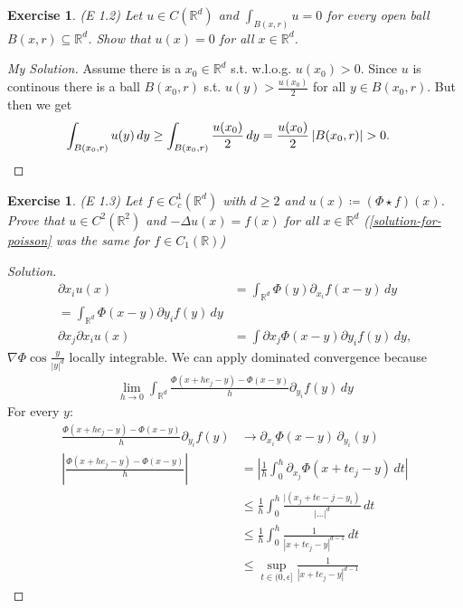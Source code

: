 \documentclass{report}
\theoremstyle{tommy}
\newtheorem{ex}[defn]{Exercise}
\begin{document}
\begin{ex} (E 1.2)
  Let \(u \in C(\mathbb{R}^d)\) and \(\int_{B(x, r)} u = 0\) for every open ball \(B(x, r) \subseteq \mathbb{R}^d\). Show that \(u(x) = 0\) for all \(x \in \mathbb{R}^d\).
\end{ex}

\begin{proof} [My Solution]
  Assume there is a \(x_0 \in \mathbb{R}^d\) s.t. w.l.o.g. \(u(x_0) > 0\). Since \(u\) is continous there is a ball \(B(x_0, r)\) s.t. \(u(y) > \frac{u(x_0)}{2}\) for all \(y \in B(x_0, r)\). But then we get
  \begin{align*}
    \int_{B(x_0, r)} u(y) \, dy
    &\ge \int_{B(x_0, r)} \frac{u(x_0)}{2} \, dy
    = \frac{u(x_0)}{2} \, |B(x_0, r)| > 0. \qedhere
  \end{align*}
\end{proof}

\begin{ex} (E 1.3)
  Let \(f \in C_c^1(\mathbb{R}^d)\) with \(d \ge 2\) and \(u(x) \coloneqq (\Phi \star f)(x)\). Prove that \(u \in C^2(\mathbb{R}^2)\) and \(- \Delta u(x) = f(x)\) for all \(x \in \mathbb{R}^d\) (\ref{solution-for-poisson} was the same for \(f \in C_1(\mathbb{R})\))
\end{ex}

\begin{proof} [Solution]
  \begin{align*}
    \partial x_i u(x) 
    &= \int_{\mathbb{R}^d} \Phi(y) \partial_{x_i} f(x-y) \, dy \\
    = \int_{\mathbb{R}^d} \Phi(x-y) \partial y_i f(y) \, dy \\
    \partial x_j \partial x_i u(x) &= \int \partial x_j \Phi(x-y) \partial y_i f(y) \, dy,
  \end{align*}
  \(\nabla \Phi  \cos \frac{y}{|y|^d}\) locally integrable. We can apply dominated convergence because
  \begin{align*}
    \lim_{h \to 0} \int_{\mathbb{R}^d} \frac{\Phi(x + h e_j - y) - \Phi(x-y)}{h} \partial_{y_i} f(y) \, dy
  \end{align*}
  For every \(y\):
  \begin{align*}
    \frac{\Phi(x + h e_j - y) - \Phi(x-y)}{h} \partial_{y_i} f(y) &\to \partial_{x_i} \Phi(x-y) \, \partial_{y_i}(y) \\
    \left| \frac{\Phi(x + h e_j -y) - \Phi(x-y)}{h} \right| 
    &= \left|\frac{1}{h} \int_0^h \partial_{x_j} \Phi(x + te_j-y) \, dt \right|  \\
    &\le \frac{1}{h} \int_0^h \frac{|(x_j + te-j - y_i)}{| \dots |^d} \, dt \\
    &\le \frac{1}{h} \int_0^h \frac{1}{|x + te_j - y|^{d-1}} \, dt \\ 
    &\le \sup_{t \in (0, \epsilon]} \frac{1}{|x + te_j - y|^{d-1}}
  \end{align*}
\end{proof}
\end{document}
